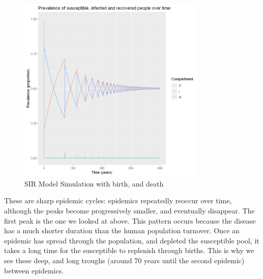 \documentclass[a4paper, 12pt, twoside]{article}
\begin{document}
\begin{figure}[htpb]
	\centering
	\includegraphics[width=0.8\textwidth]{sir-model-birth-death}
	\caption{SIR Model Simulation with birth, and death}
	\label{fig:sir-model-birth-death}
\end{figure}

These are sharp epidemic cycles: epidemics repeatedly reoccur over time, although the peaks become progressively smaller, and eventually disappear.
The first peak is the one we looked at above.
This pattern occurs because the disease has a much shorter duration than the human population turnover.
Once an epidemic has spread through the population, and depleted the susceptible pool, it takes a long time for the susceptible to replenish through births.
This is why we see these deep, and long troughs (around 70 years until the second epidemic) between epidemics.
\end{document}
